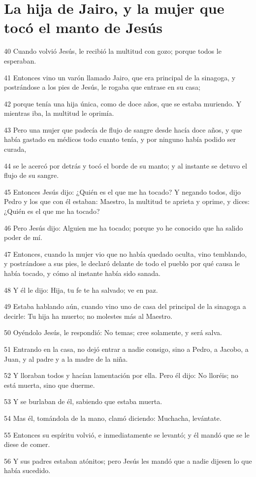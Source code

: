 \section*{La hija de Jairo, y la mujer que tocó el manto de Jesús}

\par 40 Cuando volvió Jesús, le recibió la multitud con gozo; porque todos le esperaban.
\par 41 Entonces vino un varón llamado Jairo, que era principal de la sinagoga, y postrándose a los pies de Jesús, le rogaba que entrase en su casa;
\par 42 porque tenía una hija única, como de doce años, que se estaba muriendo. Y mientras iba, la multitud le oprimía.
\par 43 Pero una mujer que padecía de flujo de sangre desde hacía doce años, y que había gastado en médicos todo cuanto tenía, y por ninguno había podido ser curada,
\par 44 se le acercó por detrás y tocó el borde de su manto; y al instante se detuvo el flujo de su sangre.
\par 45 Entonces Jesús dijo: ¿Quién es el que me ha tocado? Y negando todos, dijo Pedro y los que con él estaban: Maestro, la multitud te aprieta y oprime, y dices: ¿Quién es el que me ha tocado?
\par 46 Pero Jesús dijo: Alguien me ha tocado; porque yo he conocido que ha salido poder de mí.
\par 47 Entonces, cuando la mujer vio que no había quedado oculta, vino temblando, y postrándose a sus pies, le declaró delante de todo el pueblo por qué causa le había tocado, y cómo al instante había sido sanada.
\par 48 Y él le dijo: Hija, tu fe te ha salvado; ve en paz.
\par 49 Estaba hablando aún, cuando vino uno de casa del principal de la sinagoga a decirle: Tu hija ha muerto; no molestes más al Maestro.
\par 50 Oyéndolo Jesús, le respondió: No temas; cree solamente, y será salva.
\par 51 Entrando en la casa, no dejó entrar a nadie consigo, sino a Pedro, a Jacobo, a Juan, y al padre y a la madre de la niña.
\par 52 Y lloraban todos y hacían lamentación por ella. Pero él dijo: No lloréis; no está muerta, sino que duerme.
\par 53 Y se burlaban de él, sabiendo que estaba muerta.
\par 54 Mas él, tomándola de la mano, clamó diciendo: Muchacha, levántate.
\par 55 Entonces su espíritu volvió, e inmediatamente se levantó; y él mandó que se le diese de comer.
\par 56 Y sus padres estaban atónitos; pero Jesús les mandó que a nadie dijesen lo que había sucedido.

